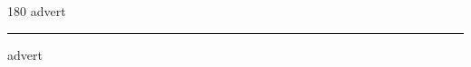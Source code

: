 
\begin{frame}
\begin{center}
\begin{turn}{180}
{\fontsize{2.5cm}{1em}\selectfont advert}
\end{turn}
\vspace{1em}\par  
\hrule
\vspace{1em}\par  
{\fontsize{2.5cm}{1em}\selectfont advert}
\end{center}
\end{frame}
